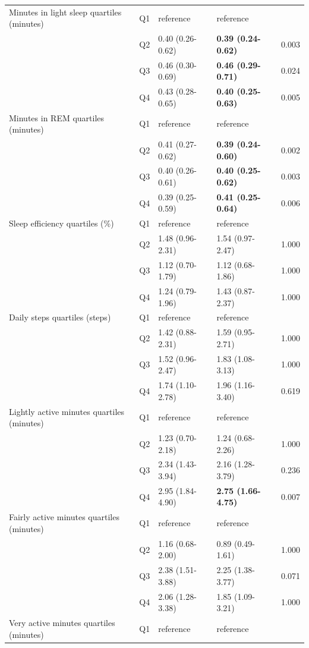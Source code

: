 \documentclass[11pt]{article}
\begin{document}
\begin{longtable}{@{}p{5.2cm}c p{3.0cm} p{3.0cm} r@{}}
\addlinespace
Minutes in light sleep quartiles (minutes) & Q1 & reference & reference & \\
 & Q2 & 0.40 (0.26-0.62) & \textbf{0.39 (0.24-0.62)} & 0.003 \\
 & Q3 & 0.46 (0.30-0.69) & \textbf{0.46 (0.29-0.71)} & 0.024 \\
 & Q4 & 0.43 (0.28-0.65) & \textbf{0.40 (0.25-0.63)} & 0.005 \\
\addlinespace
Minutes in REM quartiles (minutes) & Q1 & reference & reference & \\
 & Q2 & 0.41 (0.27-0.62) & \textbf{0.39 (0.24-0.60)} & 0.002 \\
 & Q3 & 0.40 (0.26-0.61) & \textbf{0.40 (0.25-0.62)} & 0.003 \\
 & Q4 & 0.39 (0.25-0.59) & \textbf{0.41 (0.25-0.64)} & 0.006 \\
\addlinespace
Sleep efficiency quartiles (\%) & Q1 & reference & reference & \\
 & Q2 & 1.48 (0.96-2.31) & 1.54 (0.97-2.47) & 1.000 \\
 & Q3 & 1.12 (0.70-1.79) & 1.12 (0.68-1.86) & 1.000 \\
 & Q4 & 1.24 (0.79-1.96) & 1.43 (0.87-2.37) & 1.000 \\
\addlinespace
Daily steps quartiles (steps) & Q1 & reference & reference & \\
 & Q2 & 1.42 (0.88-2.31) & 1.59 (0.95-2.71) & 1.000 \\
 & Q3 & 1.52 (0.96-2.47) & 1.83 (1.08-3.13) & 1.000 \\
 & Q4 & 1.74 (1.10-2.78) & 1.96 (1.16-3.40) & 0.619 \\
\addlinespace
Lightly active minutes quartiles (minutes) & Q1 & reference & reference & \\
 & Q2 & 1.23 (0.70-2.18) & 1.24 (0.68-2.26) & 1.000 \\
 & Q3 & 2.34 (1.43-3.94) & 2.16 (1.28-3.79) & 0.236 \\
 & Q4 & 2.95 (1.84-4.90) & \textbf{2.75 (1.66-4.75)} & 0.007 \\
\addlinespace
Fairly active minutes quartiles (minutes) & Q1 & reference & reference & \\
 & Q2 & 1.16 (0.68-2.00) & 0.89 (0.49-1.61) & 1.000 \\
 & Q3 & 2.38 (1.51-3.88) & 2.25 (1.38-3.77) & 0.071 \\
 & Q4 & 2.06 (1.28-3.38) & 1.85 (1.09-3.21) & 1.000 \\
\addlinespace
Very active minutes quartiles (minutes) & Q1 & reference & reference & \\

\end{longtable}
\end{document}
